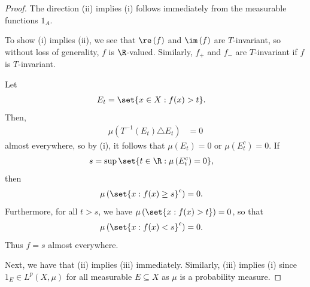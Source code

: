 \documentclass[10pt]{mypackage}
\begin{document}
\begin{proof}
  The direction (ii) implies (i) follows immediately from the measurable functions $1_A$.

  To show (i) implies (ii), we see that $\re\left( f \right)$ and $\im\left( f \right)$ are $T$-invariant, so without loss of generality, $f$ is $\R$-valued. Similarly, $f_{+}$ and $f_{-}$ are $T$-invariant if $f$ is $T$-invariant.

  Let
  \begin{align*}
    E_t &= \set{x\in X : f(x) > t}.
  \end{align*}
  Then,
  \begin{align*}
    \mu\left( T^{-1}\left( E_t \right)\triangle E_t \right) &= 0
  \end{align*}
  almost everywhere, so by (i), it follows that $\mu\left( E_t \right) = 0$ or $\mu\left( E_t^{c} \right) = 0$. If
  \begin{align*}
    s &= \sup\set{t\in \R : \mu\left( E_t^{c} \right) = 0},
  \end{align*}
  then
  \begin{align*}
    \mu\left( \set{x : f(x) \geq s}^{c} \right) &= 0.
  \end{align*}
  Furthermore, for all $t > s$, we have $\mu\left( \set{x : f(x) > t} \right) = 0$, so that
  \begin{align*}
    \mu\left( \set{x : f(x) < s}^{c} \right) &= 0.
  \end{align*}
  Thus $f = s$ almost everywhere.

  Next, we have that (ii) implies (iii) immediately. Similarly, (iii) implies (i) since $1_E\in L^p\left( X,\mu \right)$ for all measurable $E\subseteq X$ as $\mu$ is a probability measure.


\end{proof}
\end{document}
